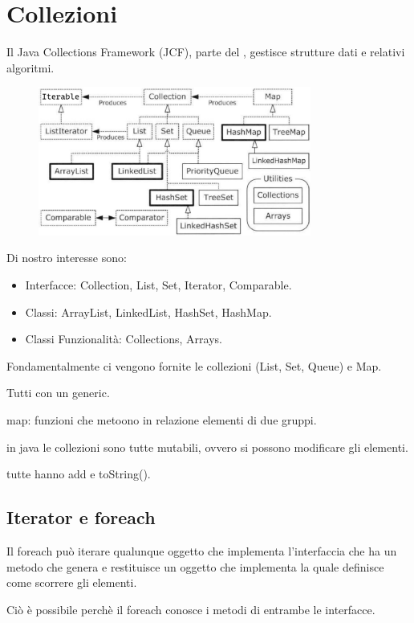 \section{Collezioni}
Il Java Collections Framework (JCF), parte del , gestisce strutture dati e relativi algoritmi.
\begin{figure}[h]
	\centering
	\includegraphics[width=0.8\textwidth]{JCF.png}
\end{figure}

Di nostro interesse sono:
\begin{itemize}
	\item Interfacce: Collection, List, Set, Iterator, Comparable.
	\item Classi: ArrayList, LinkedList, HashSet, HashMap.
	\item Classi Funzionalità: Collections, Arrays.
\end{itemize}

Fondamentalmente ci vengono fornite le collezioni (List, Set, Queue) e Map.

Tutti con un generic.

map: funzioni che metoono in relazione elementi di due gruppi.

in java le collezioni sono tutte mutabili, ovvero si possono modificare gli elementi.

tutte hanno add e toString().

\subsection{Iterator e foreach}
Il foreach può iterare qualunque oggetto che implementa l'interfaccia  che ha un metodo che genera e restituisce un oggetto che implementa  la quale definisce come scorrere gli elementi.

Ciò è possibile perchè il foreach conosce i metodi di entrambe le interfacce.

